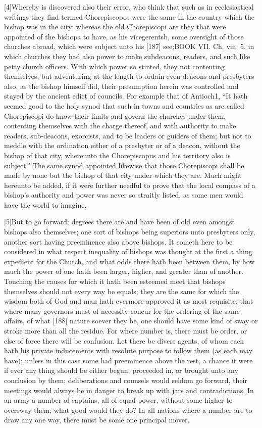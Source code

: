 [4]Whereby is discovered also their error, who think that such as in ecclesiastical writings they find termed Chorepiscopos were the same in the country which the bishop was in the city: whereas the old Chorepiscopi are they that were appointed of the bishopa to have, as his vicegerentsb, some oversight of those churches abroad, which were subject unto his [187] see;BOOK VII. Ch. viii. 5. in which churches they had also power to make subdeacons, readers, and such like petty church officers. With which power so stinted, they not contenting themselves, but adventuring at the length to ordain even deacons and presbyters also, as the bishop himself did, their presumption herein was controlled and stayed by the ancient edict of councils. For example that of Antioch1, “It hath seemed good to the holy synod that such in towns and countries as are called Chorepiscopi do know their limits and govern the churches under them, contenting themselves with the charge thereof, and with authority to make readers, sub-deacons, exorcists, and to be leaders or guiders of them; but not to meddle with the ordination either of a presbyter or of a deacon, without the bishop of that city, whereunto the Chorepiscopus and his territory also is subject.” The same synod appointed likewise that those Chorepiscopi shall be made by none but the bishop of that city under which they are. Much might hereunto be added, if it were further needful to prove that the local compass of a bishop’s authority and power was never so straitly listed, as some men would have the world to imagine.

[5]But to go forward; degrees there are and have been of old even amongst bishops also themselves; one sort of bishops being superiors unto presbyters only, another sort having preeminence also above bishops. It cometh here to be considered in what respect inequality of bishops was thought at the first a thing expedient for the Church, and what odds there hath been between them, by how much the power of one hath been larger, higher, and greater than of another. Touching the causes for which it hath been esteemed meet that bishops themselves should not every way be equals; they are the same for which the wisdom both of God and man hath evermore approved it as most requisite, that where many governors must of necessity concur for the ordering of the same affairs, of what [188] nature soever they be, one should have some kind of sway or stroke more than all the residue. For where number is, there must be order, or else of force there will be confusion. Let there be divers agents, of whom each hath his private inducements with resolute purpose to follow them (as each may have); unless in this case some had preeminence above the rest, a chance it were if ever any thing should be either begun, proceeded in, or brought unto any conclusion by them; deliberations and counsels would seldom go forward, their meetings would always be in danger to break up with jars and contradictions. In an army a number of captains, all of equal power, without some higher to oversway them; what good would they do? In all nations where a number are to draw any one way, there must be some one principal mover.

